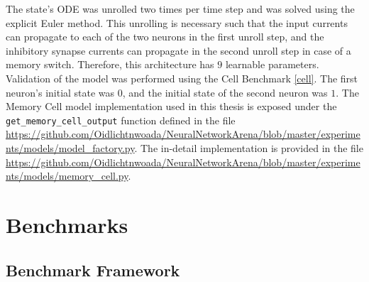 \documentclass[draft,final]{vutinfth} %
\begin{document}
    The state's ODE was unrolled two times per time step and was solved using the explicit Euler method.
    This unrolling is necessary such that the input currents can propagate to each of the two neurons in the first unroll step, and the inhibitory synapse currents can propagate in the second unroll step in case of a memory switch.
    Therefore, this architecture has $9$ learnable parameters.
    Validation of the model was performed using the Cell Benchmark \ref{cell}.
    The first neuron's initial state was $0$, and the initial state of the second neuron was $1$.
    The Memory Cell model implementation used in this thesis is exposed under the \texttt{get\_memory\_cell\_output} function defined in the file \url{https://github.com/Oidlichtnwoada/NeuralNetworkArena/blob/master/experiments/models/model_factory.py}.
    The in-detail implementation is provided in the file \url{https://github.com/Oidlichtnwoada/NeuralNetworkArena/blob/master/experiments/models/memory_cell.py}.


    \chapter{Benchmarks}


    \section{Benchmark Framework}
\end{document}
